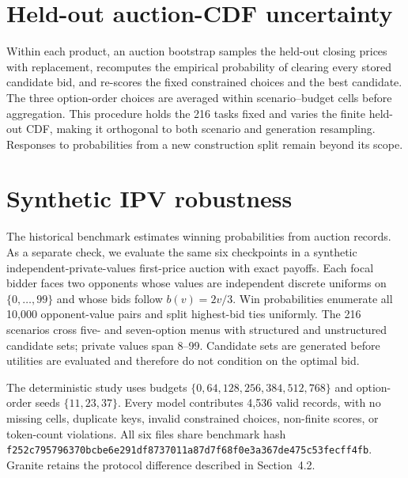 \documentclass{article}
\begin{document}
\FloatBarrier
\section{Held-out auction-CDF uncertainty}
\label{app:auctioncdf}

Within each product, an auction bootstrap samples the held-out closing prices with replacement, recomputes the empirical probability of clearing every stored candidate bid, and re-scores the fixed constrained choices and the best candidate. The three option-order choices are averaged within scenario--budget cells before aggregation. This procedure holds the 216 tasks fixed and varies the finite held-out CDF, making it orthogonal to both scenario and generation resampling. Responses to probabilities from a new construction split remain beyond its scope.



\FloatBarrier
\section{Synthetic IPV robustness}
\label{app:syntheticipv}

The historical benchmark estimates winning probabilities from auction records. As a separate check, we evaluate the same six checkpoints in a synthetic independent-private-values first-price auction with exact payoffs. Each focal bidder faces two opponents whose values are independent discrete uniforms on $\{0,\ldots,99\}$ and whose bids follow $b(v)=2v/3$. Win probabilities enumerate all 10,000 opponent-value pairs and split highest-bid ties uniformly. The 216 scenarios cross five- and seven-option menus with structured and unstructured candidate sets; private values span 8--99. Candidate sets are generated before utilities are evaluated and therefore do not condition on the optimal bid.

The deterministic study uses budgets $\{0,64,128,256,384,512,768\}$ and option-order seeds $\{11,23,37\}$. Every model contributes 4,536 valid records, with no missing cells, duplicate keys, invalid constrained choices, non-finite scores, or token-count violations. All six files share benchmark hash \nolinkurl{f252c795796370bcbe6e291df8737011a87d7f68f0e3a367de475c53fecff4fb}. Granite retains the protocol difference described in Section~4.2.
\end{document}
